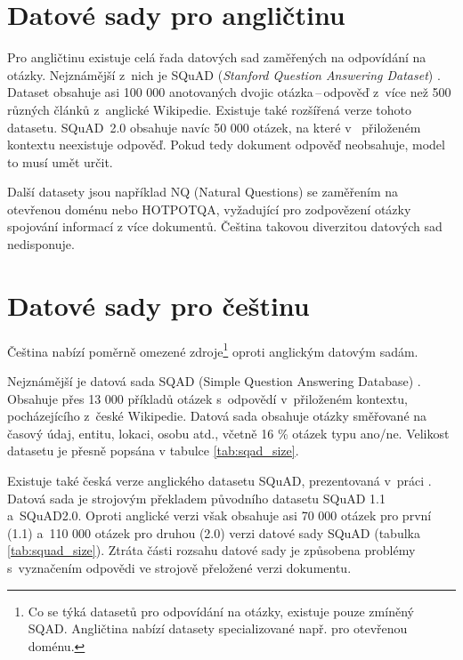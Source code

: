 \section{Datové sady pro angličtinu}
Pro angličtinu existuje celá řada datových sad zaměřených na odpovídání na otázky. Nejznámější z~nich je  SQuAD (\emph{Stanford Question Answering Dataset}) \cite{squad}. Dataset obsahuje asi 100 000 anotovaných dvojic otázka\,--\,odpověď z~více než 500 různých článků z~anglické Wikipedie. Existuje také rozšířená verze tohoto datasetu. SQuAD~2.0 \cite{squad_v2} obsahuje navíc 50 000 otázek, na které v~ přiloženém kontextu neexistuje odpověď. Pokud tedy dokument odpověď neobsahuje, model to musí umět určit.\par
Další datasety jsou například NQ (Natural Questions) se zaměřením na otevřenou doménu nebo HOTPOTQA, vyžadující pro zodpovězení otázky spojování informací z více dokumentů. Čeština takovou diverzitou datových sad nedisponuje.

\section{Datové sady pro češtinu}
Čeština nabízí poměrně omezené zdroje\footnote{Co se týká datasetů pro odpovídání na otázky, existuje pouze zmíněný SQAD. Angličtina nabízí datasety specializované např. pro otevřenou doménu.} oproti anglickým datovým sadám.\par 
Nejznámější je datová sada SQAD (Simple Question Answering Database) \cite{sqad}. Obsahuje přes 13 000 příkladů otázek s~odpovědí v~přiloženém kontextu, pocházejícího z~české Wikipedie. Datová sada obsahuje otázky směřované na časový údaj, entitu, lokaci, osobu atd., včetně 16 \% otázek typu ano/ne. Velikost datasetu je přesně popsána v tabulce \ref{tab:sqad_size}.\par
Existuje také česká verze anglického datasetu SQuAD, prezentovaná v~práci \cite{czech_squad}. Datová sada je strojovým překladem původního datasetu SQuAD 1.1 a~SQuAD2.0. Oproti anglické verzi však obsahuje asi 70 000 otázek pro první (1.1) a~110 000 otázek pro druhou (2.0) verzi datové sady SQuAD (tabulka \ref{tab:squad_size}). Ztráta části rozsahu datové sady je způsobena problémy s~vyznačením odpovědi ve strojově přeložené verzi dokumentu.

